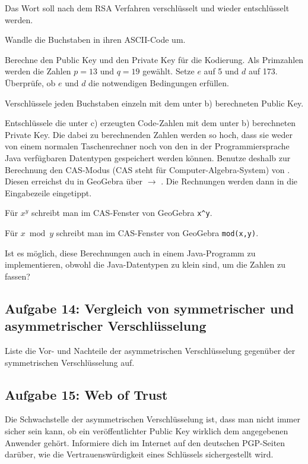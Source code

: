 Das Wort  soll nach dem RSA Verfahren verschlüsselt und
wieder entschlüsselt werden.

\begin{compactenum}[a)]
\item Wandle die Buchstaben in ihren ASCII-Code um. 
\item Berechne den Public Key und den Private Key für die Kodierung. Als
Primzahlen werden die Zahlen $p=13$ und $q=19$ gewählt. Setze $e$ auf 5 und $d$
auf 173. Überprüfe, ob $e$ und $d$ die notwendigen Bedingungen erfüllen.
\item Verschlüssele jeden Buchstaben einzeln mit dem unter b) berechneten Public
 Key.
\item Entschlüssele die unter c) erzeugten Code-Zahlen mit dem unter b)
berechneten Private Key. Die dabei zu berechnenden Zahlen werden so hoch, dass
sie weder von einem normalen Taschenrechner noch von den in der
Programmiersprache Java verfügbaren Datentypen gespeichert werden können.
Benutze deshalb zur Berechnung den CAS-Modus (CAS steht
für Computer-Algebra-System) von . Diesen erreichst du in
GeoGebra über  $\rightarrow$ . Die
Rechnungen werden dann in die Eingabezeile eingetippt.

Für $x^y$ schreibt man im CAS-Fenster von GeoGebra \lstinline|x^y|.

Für $x \bmod y$ schreibt man im CAS-Fenster von GeoGebra \lstinline|mod(x,y)|.
\item Ist es möglich, diese Berechnungen auch in einem Java-Programm zu
implementieren, obwohl die Java-Datentypen zu klein sind, um die Zahlen zu
fassen?
\end{compactenum}


\subsection{Aufgabe 14: Vergleich von symmetrischer und asymmetrischer
Verschlüsselung} 
Liste die Vor- und Nachteile der asymmetrischen Verschlüsselung
gegenüber der symmetrischen Verschlüsselung auf.


\subsection{Aufgabe 15: Web of Trust}

Die Schwachstelle der asymmetrischen Verschlüsselung ist, dass man nicht immer
sicher sein kann, ob ein veröffentlichter Public Key wirklich dem angegebenen
Anwender gehört. Informiere dich im Internet auf den deutschen PGP-Seiten
darüber, wie die Vertrauenswürdigkeit eines Schlüssels sichergestellt wird.
